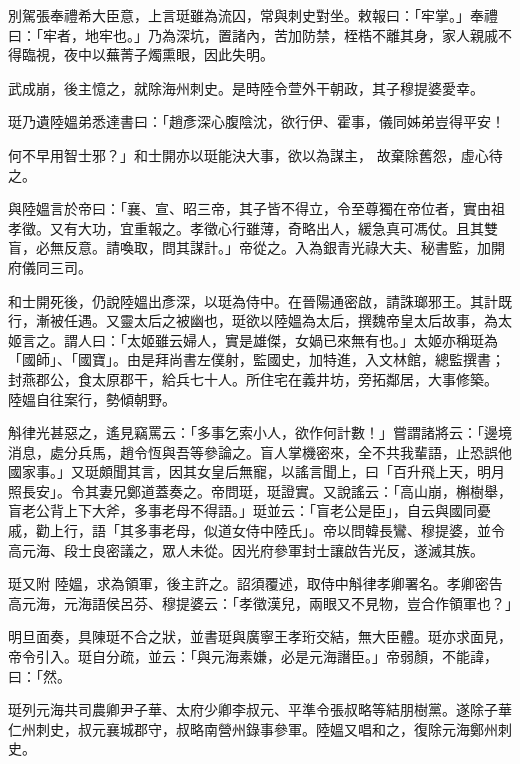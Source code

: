 \begin{pinyinscope}
 別駕張奉禮希大臣意，上言珽雖為流囚，常與刺史對坐。敕報曰：「牢掌。」奉禮曰：「牢者，地牢也。」乃為深坑，置諸內，苦加防禁，桎梏不離其身，家人親戚不得臨視，夜中以蕪菁子燭熏眼，因此失明。



 武成崩，後主憶之，就除海州刺史。是時陸令萱外干朝政，其子穆提婆愛幸。



 珽乃遺陸媼弟悉達書曰：「趙彥深心腹陰沈，欲行伊、霍事，儀同姊弟豈得平安！



 何不早用智士邪？」和士開亦以珽能決大事，欲以為謀主，
 故棄除舊怨，虛心待之。



 與陸媼言於帝曰：「襄、宣、昭三帝，其子皆不得立，令至尊獨在帝位者，實由祖孝徵。又有大功，宜重報之。孝徵心行雖薄，奇略出人，緩急真可馮仗。且其雙盲，必無反意。請喚取，問其謀計。」帝從之。入為銀青光祿大夫、秘書監，加開府儀同三司。



 和士開死後，仍說陸媼出彥深，以珽為侍中。在晉陽通密啟，請誅瑯邪王。其計既行，漸被任遇。又靈太后之被幽也，珽欲以陸媼為太后，撰魏帝皇太后故事，為太姬言之。謂人曰：「太姬雖云婦人，實是雄傑，女媧已來無有也。」太姬亦稱珽為「國師」、「國寶」。由是拜尚書左僕射，監國史，加特進，入文林館，總監撰書；封燕郡公，食太原郡干，給兵七十人。所住宅在義井坊，旁拓鄰居，大事修築。
 陸媼自往案行，勢傾朝野。



 斛律光甚惡之，遙見竊罵云：「多事乞索小人，欲作何計數！」嘗謂諸將云：「邊境消息，處分兵馬，趙令恆與吾等參論之。盲人掌機密來，全不共我輩語，止恐誤他國家事。」又珽頗聞其言，因其女皇后無寵，以謠言聞上，曰「百升飛上天，明月照長安」。令其妻兄鄭道蓋奏之。帝問珽，珽證實。又說謠云：「高山崩，槲樹舉，盲老公背上下大斧，多事老母不得語。」珽並云：「盲老公是臣」，自云與國同憂戚，勸上行，語「其多事老母，似道女侍中陸氏」。帝以問韓長鸞、穆提婆，並令高元海、段士良密議之，眾人未從。因光府參軍封士讓啟告光反，遂滅其族。



 珽又附
 陸媼，求為領軍，後主許之。詔須覆述，取侍中斛律孝卿署名。孝卿密告高元海，元海語侯呂芬、穆提婆云：「孝徵漢兒，兩眼又不見物，豈合作領軍也？」



 明旦面奏，具陳珽不合之狀，並書珽與廣寧王孝珩交結，無大臣體。珽亦求面見，帝令引入。珽自分疏，並云：「與元海素嫌，必是元海譖臣。」帝弱顏，不能諱，曰：「然。



 珽列元海共司農卿尹子華、太府少卿李叔元、平準令張叔略等結朋樹黨。遂除子華仁州刺史，叔元襄城郡守，叔略南營州錄事參軍。陸媼又唱和之，復除元海鄭州刺史。




\end{pinyinscope}
